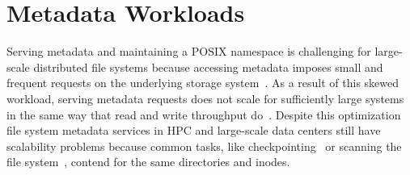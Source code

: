 

\section{Metadata Workloads}
Serving metadata and maintaining a POSIX namespace is challenging for
large-scale distributed file systems because accessing metadata imposes small
and frequent requests on the underlying storage
system~\cite{roselli:atec2000-FS-workloads}. As a result of this skewed
workload, serving metadata requests does not scale for sufficiently large
systems in the same way that read and write throughput
do~\cite{abad:ucc2012-mimesis, alam:pdsw2011-metadata-scaling,
weil:osdi2006-ceph}.  Despite this optimization file system metadata services
in HPC and large-scale data centers still have scalability problems because
common tasks, like checkpointing~\cite{bent_plfs_2009} or scanning the file
system~\cite{zheng:pdsw2014-batchfs}, contend for the same directories and
inodes.

